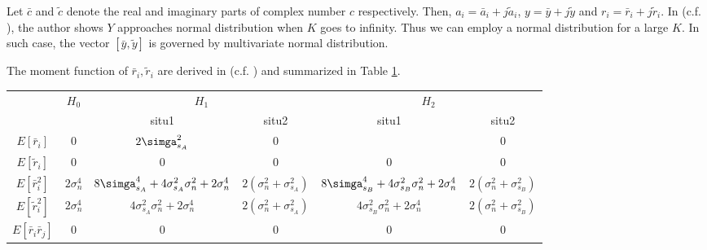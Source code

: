 Let $\bar{c}$ and $\tilde{c}$ denote the real and imaginary parts of complex number $c$ respectively. Then, $a_i = \bar{a}_i + j\tilde{a}_i$, $y = \bar{y}+j\tilde{y}$  and $r_i = \bar{r}_i + j\tilde{r}_i$. 
In (c.f. ), the author shows $Y$ approaches normal distribution when $K$ goes to infinity. Thus we can employ a normal distribution for a large $K$. In such case, the vector $[\bar{y}, \tilde{y}]$ is governed by multivariate normal distribution. 

The moment function of $\bar{r}_i, \tilde{r}_i$ are derived in (c.f. ) and summarized in Table \ref{table1}.
\begin{table}[h]
  \label{table1}
  \begin{tabular}{|c|c|c|c|c|c|}
	\hline
    \multirow{2}{*}{}           & \multirow{2}{*}{$H_0$} & \multicolumn{2}{c|}{$H_1$}                                                               & \multicolumn{2}{c|}{$H_2$}                                                               \\ \cline{3-6} 
	&                        & situ1                                                   & situ2                          & situ1                                                   & situ2                          \\ \hline
	$E[\bar{r}_i]$              & $0$                    & $2\simga_{s_A}^2$                                       & $0$                            &                                                         & $0$                            \\ \hline
	$E[\tilde{r}_i]$            & $0$                    & $0$                                                     & $0$                            & $0$                                                     & $0$                            \\ \hline
	$E[\bar{r}_i^2]$            & $2\sigma_n^4$          & $8\simga_{s_A}^4+4\sigma_{s_A}^2\sigma_n^2+2\sigma_n^4$ & $2(\sigma_n^2+\sigma_{s_A}^2)$ & $8\simga_{s_B}^4+4\sigma_{s_B}^2\sigma_n^2+2\sigma_n^4$ & $2(\sigma_n^2+\sigma_{s_B}^2)$ \\ \hline
	$E[\tilde{r}_i^2]$          & $2\sigma_n^4$          & $4\sigma_{s_A}^2\sigma_n^2+2\sigma_n^4$                 & $2(\sigma_n^2+\sigma_{s_A}^2)$ & $4\sigma_{s_B}^2\sigma_n^2+2\sigma_n^4$                 & $2(\sigma_n^2+\sigma_{s_B}^2)$ \\ \hline
	$E[\bar{r}_i\bar{r}_j]$     & $0$                    & $0$                                                     & $0$                            & $0$                                                     & $0$                            \\ \hline

\end{tabular}
\end{table}
